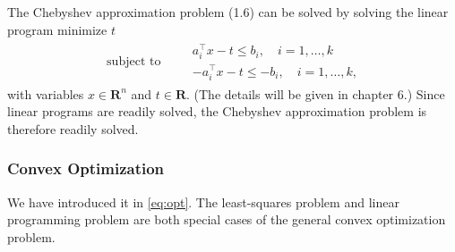 \documentclass{article}
\begin{document}

The Chebyshev approximation problem (1.6) can be solved by solving the linear program minimize $t$
\begin{align*}
\text { subject to } \quad \begin{aligned}
& a_{i}^{\top} x-t \leq b_{i}, \quad i=1, \ldots, k \\
&-a_{i}^{\top} x-t \leq-b_{i}, \quad i=1, \ldots, k,
\end{aligned}
\end{align*}
with variables $x \in \mathbf{R}^{n}$ and $t \in \mathbf{R} .$ (The details will be given in chapter 6.) Since linear programs are readily solved, the Chebyshev approximation problem is therefore readily solved.

\subsubsection{Convex Optimization}
We have introduced it in \cref{eq:opt}. The least-squares problem and linear programming problem  are both special cases of the general convex optimization problem.
\end{document}
